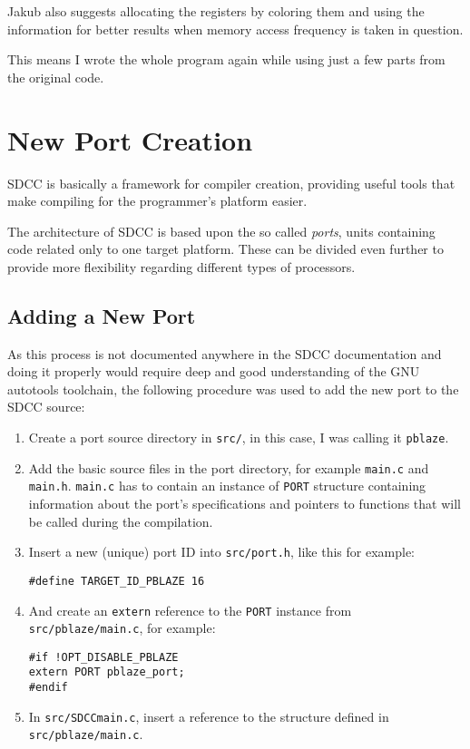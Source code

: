     Jakub also suggests allocating the registers by coloring them and using the information for better results when memory access frequency is taken in question.

    This means I wrote the whole program again while using just a few parts from the original code.


\chapter{New Port Creation}\label{port}

SDCC is basically a framework for compiler creation, providing useful tools that make compiling for the programmer's platform easier.

The architecture of SDCC is based upon the so called \emph{ports}, units containing code related only to one target platform. These can be divided even further to provide more flexibility regarding different types of processors.

    \section{Adding a New Port}

    As this process is not documented anywhere in the SDCC documentation and doing it properly would require deep and good understanding of the GNU autotools toolchain, the following procedure was used to add the new port to the SDCC source:

    \begin{enumerate}

    \item Create a port source directory in \texttt{src/}, in this case, I was calling it \texttt{pblaze}.

    \item Add the basic source files in the port directory, for example \texttt{main.c} and \texttt{main.h}. \texttt{main.c} has to contain an instance of \texttt{PORT} structure containing information about the port's specifications and pointers to functions that will be called during the compilation.

    \item Insert a new (unique) port ID into \texttt{src/port.h}, like this for example:

    \texttt{\#define TARGET\_ID\_PBLAZE    16}

    \item And create an \texttt{extern} reference to the \texttt{PORT} instance from \texttt{src/pblaze/main.c}, for example:

\begin{verbatim}#if !OPT_DISABLE_PBLAZE
extern PORT pblaze_port;
#endif\end{verbatim}

    \item In \texttt{src/SDCCmain.c}, insert a reference to the structure defined in \texttt{src/pblaze/main.c}.

    \end{enumerate}

